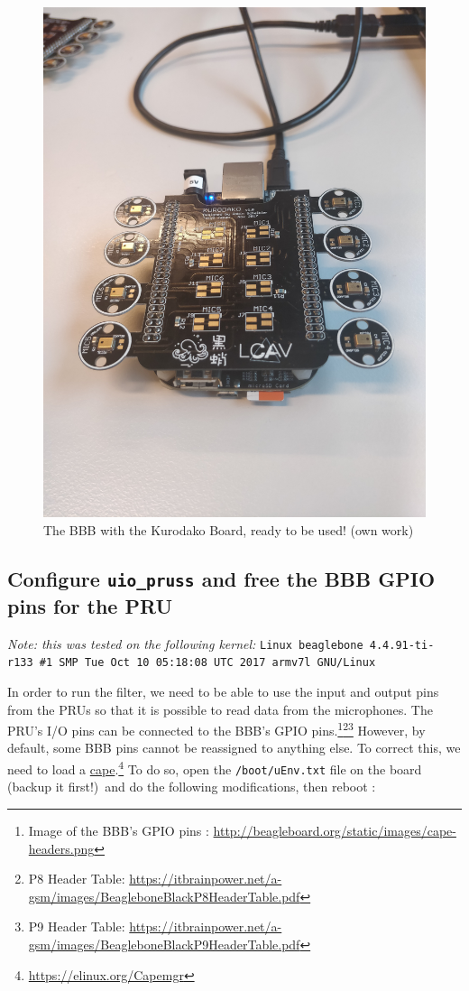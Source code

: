 \documentclass[]{report}
\begin{document}
\begin{figure}
\centering
\includegraphics[width=0.4\linewidth]{Pictures/BBBkurodako.jpg}
\caption{The BBB with the Kurodako Board, ready to be used! (own work)}
\end{figure}

\hypertarget{configure-uio-pruss-and-free-the-gpio-pins-for-the-pru}{%
	\subsection{\texorpdfstring{Configure \texttt{uio\_pruss} and free
			the BBB GPIO pins for the
			PRU}{Configure uio\textunderscore pruss and free the BBB GPIO pins for the PRU}}\label{configure-uio-pruss-and-free-the-gpio-pins-for-the-pru}}

\emph{Note: this was tested on the following kernel:}
\texttt{Linux beaglebone\ 4.4.91-ti-r133\ \#1\ SMP\ Tue\ Oct\ 10\ 05:18:08\ UTC\ 2017\ armv7l\ GNU/Linux}

In order to run the filter, we need to be able to use the input and
output pins from the PRUs so that it is possible to read data from the microphones. The PRU's I/O pins can be connected to the BBB's GPIO pins.\footnote{Image of the BBB's GPIO pins : \url{http://beagleboard.org/static/images/cape-headers.png}}\footnote{P8 Header Table: \url{https://itbrainpower.net/a-gsm/images/BeagleboneBlackP8HeaderTable.pdf}}\footnote{P9 Header Table: \url{https://itbrainpower.net/a-gsm/images/BeagleboneBlackP9HeaderTable.pdf}} However, by default, some BBB pins cannot be reassigned to anything else. To correct this, we need to
load a \href{https://elinux.org/Capemgr}{cape}.\footnote{\url{https://elinux.org/Capemgr}} To do so, open the
\texttt{/boot/uEnv.txt} file on the board (backup it first!)~and do the
following modifications, then reboot :\\
\end{document}
